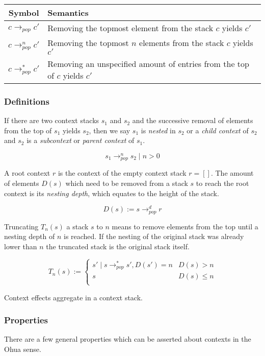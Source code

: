 \begin{tabular}{c | l}
  Symbol & Semantics \\ \hline
  $c \rightarrow_{pop} c'$ & Removing the topmost element from the stack $c$ yields $c'$ \\
  $c \rightarrow_{pop}^n c'$ & Removing the topmost $n$ elements from the stack $c$ yields $c'$ \\
  $c \rightarrow_{pop}^* c'$ & Removing an unspecified amount of entries from the top of $c$ yields $c'$ \\
\end{tabular}

\subsubsection{Definitions}

If there are two context stacks $s_1$ and $s_2$ and the successive removal of elements from the top of $s_1$ yields $s_2$, then we say $s_1$ is \textit{nested} in $s_2$ or a \emph{child context} of $s_2$ and $s_2$ is a \textit{subcontext} or \emph{parent context} of $s_1$.

\[
  s_1 \rightarrow_{pop}^n s_2 \mid n > 0
\]

A root context $r$ is the context of the empty context stack $r = []$.
The amount of elements $D(s)$ which need to be removed from a stack $s$ to reach the root context is its \emph{nesting depth}, which equates to the height of the stack.

\[
  D(s) := s \rightarrow_{pop}^d r
\]

Truncating $T_n(s)$ a stack $s$ to $n$ means to remove elements from the top until a nesting depth of $n$ is reached.
If the nesting of the original stack was already lower than $n$ the truncated stack is the original stack itself.

\[
  T_n(s) :=
  \begin{cases}
    s' \mid s \rightarrow_{pop}^* s', D(s') = n & D(s) > n \\
    s & D(s) \leq n \\
  \end{cases}
\]

Context effects aggregate in a context stack.


\subsubsection{Properties}

There are a few general properties which can be asserted about contexts in the Ohua sense.

